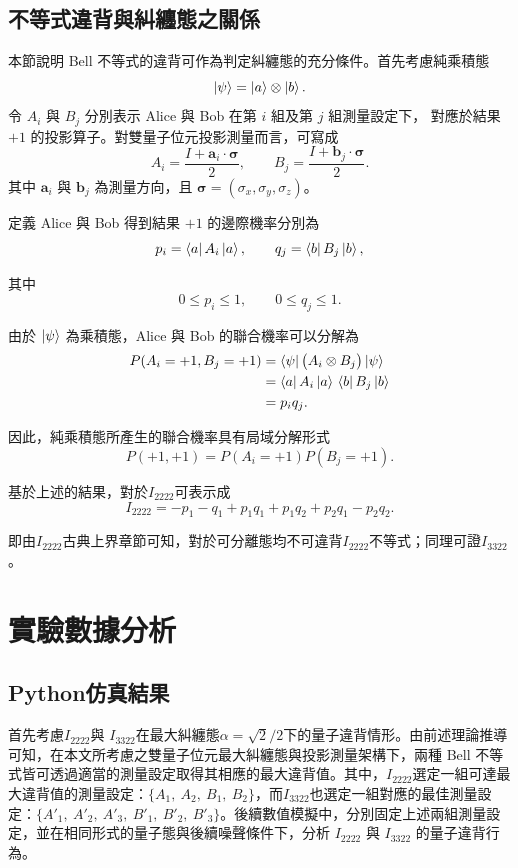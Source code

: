 \documentclass[12pt, a4paper, twoside, reqno]{article}
\begin{document}
\subsection{不等式違背與糾纏態之關係}

本節說明 Bell 不等式的違背可作為判定糾纏態的充分條件。首先考慮純乘積態
\begin{equation}
    \ket{\psi}=\ket{a}\otimes\ket{b}.
\end{equation}
令 $A_i$ 與 $B_j$ 分別表示 Alice 與 Bob 在第 $i$ 組及第 $j$ 組測量設定下，
對應於結果 $+1$ 的投影算子。對雙量子位元投影測量而言，可寫成
\[
    A_i=\frac{I+\bm{a}_i\cdot\bm{\sigma}}{2},
    \qquad
    B_j=\frac{I+\bm{b}_j\cdot\bm{\sigma}}{2}.
\]
其中 $\bm{a}_i$ 與 $\bm{b}_j$ 為測量方向，且
$\bm{\sigma}=(\sigma_x,\sigma_y,\sigma_z)$。

\noindent 定義 Alice 與 Bob 得到結果 $+1$ 的邊際機率分別為
\begin{equation}
    p_i=\bra{a}A_i\ket{a},
    \qquad
    q_j=\bra{b}B_j\ket{b},
\end{equation}

\noindent 其中
\[
    0\leq p_i\leq 1,
    \qquad
    0\leq q_j\leq 1.
\]

\noindent 由於 $\ket{\psi}$ 為乘積態，Alice 與 Bob 的聯合機率可以分解為
\[
\begin{aligned}
P(A_i=+1,B_j=+1)
&=\bra{\psi}\bigl(A_i\otimes B_j\bigr)\ket{\psi} \\
&=\bra{a}A_i\ket{a}\,
  \bra{b}B_j\ket{b} \\
&=p_iq_j.
\end{aligned}
\]

\noindent 因此，純乘積態所產生的聯合機率具有局域分解形式
\[
    P(+1,+1)=P(A_i=+1)P(B_j=+1).
\]

\noindent 基於上述的結果，對於$I_{2222}$可表示成
\[
    I_{2222}= -p_1 - q_1 + p_1q_1 + p_1q_2 + p_2q_1 - p_2q_2.
    \]

\noindent 即由$I_{2222}$古典上界章節可知，對於可分離態均不可違背$I_{2222}$不等式；同理可證$I_{3322}$。

\section{實驗數據分析}
\subsection{Python仿真結果}
首先考慮$I_{2222}$與 $I_{3322}$在最大糾纏態$\alpha=\sqrt2/2$下的量子違背情形。由前述理論推導可知，在本文所考慮之雙量子位元最大糾纏態與投影測量架構下，兩種 Bell 不等式皆可透過適當的測量設定取得其相應的最大違背值。其中，$I_{2222}$選定一組可達最大違背值的測量設定：$\{A_1,~A_2,~B_1,~B_2\}$，而$I_{3322}$也選定一組對應的最佳測量設定：$\{A'_1,~A'_2,~A'_3,~B'_1,~B'_2,~B'_3\}$。後續數值模擬中，分別固定上述兩組測量設定，並在相同形式的量子態與後續噪聲條件下，分析 $I_{2222}$ 與 $I_{3322}$ 的量子違背行為。
\end{document}
